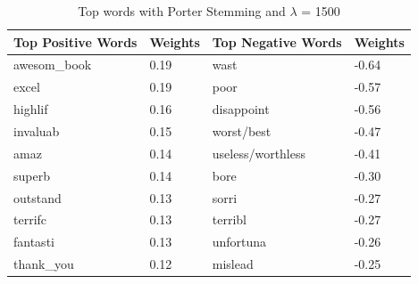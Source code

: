 \documentclass{article}
\begin{document}
\begin{table}
    \begin{tabular}{|l|l|l|l|}
        \hline
        Top Positive Words & Weights & Top Negative Words & Weights \\ \hline
	awesom\_book & 0.19 & wast  & -0.64 \\
	excel & 0.19 & poor & -0.57 \\
	highlif &   0.16 &  disappoint &  -0.56 \\ 
	invaluab & 0.15 & worst/best  & -0.47 \\
	amaz & 0.14 & useless/worthless & -0.41 \\ 
	superb & 0.14 & bore &  -0.30 \\
	outstand & 0.13 & sorri &  -0.27 \\
	terrifc & 0.13 & terribl & -0.27 \\
	fantasti & 0.13 & unfortuna &  -0.26 \\
	thank\_you & 0.12 & mislead &  -0.25 \\
        \hline
    \end{tabular}
    \caption{Top words with Porter Stemming and $\lambda$ = 1500}
    \label{tab:stemwords}
\end{table}

%

\end{document}
